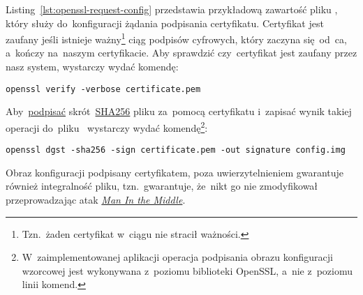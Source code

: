\documentclass[thesis]{subfiles}
\begin{document}
Listing~\ref{lst:openssl-request-config} przedstawia przykładową zawartość pliku , który służy do~konfiguracji żądania podpisania certyfikatu. Certyfikat jest zaufany jeśli istnieje ważny\footnote{Tzn.~żaden certyfikat w~ciągu nie stracił ważności.} ciąg podpisów cyfrowych, który zaczyna się~od~\gls{ca}, a~kończy na~naszym certyfikacie. Aby sprawdzić czy~certyfikat jest zaufany przez nasz system, wystarczy wydać komendę:\mynobreakpar

\begin{center}
	\texttt{openssl verify -verbose certificate.pem}
\end{center}

Aby~\href{http://stackoverflow.com/questions/10782826/digital-signature-for-a-file-using-openssl}{podpisać} skrót~\href{https://en.wikipedia.org/wiki/SHA-2}{SHA256} pliku  za~pomocą certyfikatu  i~zapisać wynik takiej operacji do~pliku~ wystarczy wydać komendę\footnote{W~zaimplementowanej aplikacji operacja podpisania obrazu konfiguracji wzorcowej jest wykonywana z~poziomu biblioteki OpenSSL, a~nie z~poziomu linii komend.}:\mynobreakpar

\begin{center}
	\texttt{openssl dgst -sha256 -sign certificate.pem -out signature config.img}
\end{center}

Obraz konfiguracji podpisany certyfikatem, poza uwierzytelnieniem gwarantuje również integralność pliku, tzn.~gwarantuje, że~nikt go nie zmodyfikował przeprowadzając atak \emph{\hyperlink{itm:mitm}{Man In the Middle}}.
\end{document}
